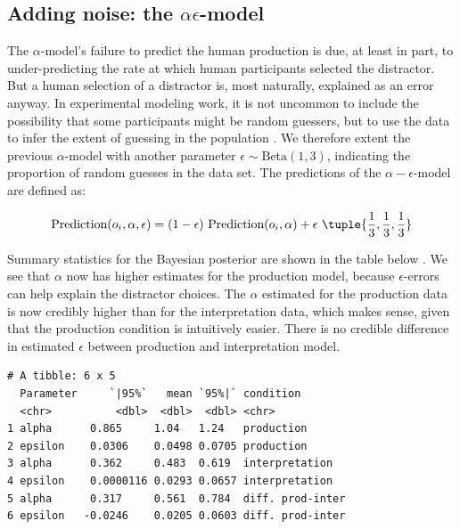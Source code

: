 \documentclass{article}
\begin{document}

\subsection{Adding noise: the \(\alpha \epsilon\)-model}
\label{sec:adding-noise-the-alpha-epsilon-model}

The $\alpha$-model's  failure to predict the human production is due, at least in part, to under-predicting the rate at which human participants selected the distractor.
But a human selection of a distractor is, most naturally, explained as an error anyway.
In experimental modeling work, it is not uncommon to include the possibility that some participants might be random guessers, but to use the data to infer the extent of guessing in the population \citep{LeeWagenmakers2013:Bayesian-Cognit}.
We therefore extent the previous $\alpha$-model with another parameter \(\epsilon \sim \text{Beta}(1,3)\), indicating the proportion of random guesses in the data set.
The predictions of the $\alpha-\epsilon$-model are defined as:

\begin{align*}
  \text{Prediction}(o_i, \alpha, \epsilon) = (1-\epsilon) \ \text{Prediction}(o_i, \alpha) + \epsilon \ \tuple{\frac{1}{3}, \frac{1}{3}, \frac{1}{3}}
\end{align*}

Summary statistics for the Bayesian posterior are shown in the table below .
We see that \(\alpha\) now has higher estimates for the production model, because \(\epsilon\)-errors can help explain the distractor choices.
The \(\alpha\) estimated for the production data is now credibly higher than for the interpretation data, which makes sense, given that the production condition is intuitively easier.
There is no credible difference in estimated \(\epsilon\) between production and interpretation model.

\begin{verbatim}
# A tibble: 6 x 5
  Parameter     `|95%`   mean `95%|` condition
  <chr>          <dbl>  <dbl>  <dbl> <chr>
1 alpha      0.865     1.04   1.24   production
2 epsilon    0.0306    0.0498 0.0705 production
3 alpha      0.362     0.483  0.619  interpretation
4 epsilon    0.0000116 0.0293 0.0657 interpretation
5 alpha      0.317     0.561  0.784  diff. prod-inter
6 epsilon   -0.0246    0.0205 0.0603 diff. prod-inter
\end{verbatim}
\end{document}
